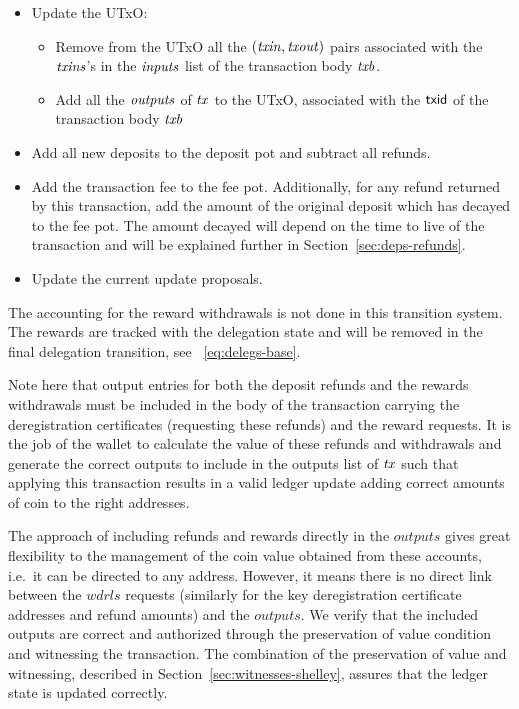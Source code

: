 \begin{itemize}
  \item Update the UTxO:
    \begin{itemize}
      \item Remove from the UTxO all the $(\mathit{txin}, \mathit{txout})$ pairs
        associated with the $\mathit{txins}$'s in the $\mathit{inputs}$ list of
        the transaction body $\mathit{txb}$.
      \item Add all the $\mathit{outputs}$ of $\mathit{tx}$ to the
        UTxO, associated with the $\mathsf{txid}$ of the transaction body $\mathit{txb}$
    \end{itemize}
  \item Add all new deposits to the deposit pot and subtract all refunds.
  \item Add the transaction fee to the fee pot. Additionally, for any refund
    returned by this transaction, add the amount of the original deposit
    which has decayed to the fee pot.
    The amount decayed will depend on the time to live of the transaction
    and will be explained further in Section~\ref{sec:deps-refunds}.
  \item Update the current update proposals.
\end{itemize}

The accounting for the reward withdrawals is not done in this transition system.
The rewards are tracked with the delegation state and will
be removed in the final delegation transition, see ~\ref{eq:delegs-base}.

Note here that output entries for both the deposit refunds and the rewards
withdrawals must be included in the body of the transaction
carrying the deregistration certificates (requesting these refunds) and the
reward requests. It is the job
of the wallet to calculate the value of these refunds and withdrawals and
generate the correct outputs to include in the outputs list of $\mathit{tx}$ such
that applying this transaction results in a
valid ledger update adding correct amounts of coin to the right addresses.

The approach of including refunds and rewards directly in the $outputs$ gives
great flexibility to the management of the coin value obtained from these
accounts, i.e.~it can be directed to any address. However, it means there is no
direct link between the $wdrls$ requests (similarly for the key deregistration
certificate addresses and refund amounts) and the $outputs$. We verify that
the included outputs are correct and authorized through the preservation of value condition
and witnessing the transaction. The combination of the
preservation of value and witnessing, described in Section~\ref{sec:witnesses-shelley},
assures that the ledger state is updated correctly.

